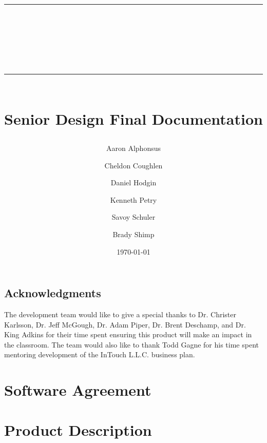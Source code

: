 \documentclass{book}
\title{{\color{SDColor3} \rule{\linewidth}{0.5mm}}\\[2mm] {\huge \bfseries \color{SDColor3} \teamName}\\[-1mm] {\color{SDColor3}\rule{\linewidth}{0.5mm}} \\  \vfill
{\LARGE \bfseries \color{SDColor4} Senior Design Final Documentation }\\  \vfill 
{\color{SDColor3} \teamName} }
\author
{
	\color{SDColor3} Aaron Alphonsus 
	\and \color{SDColor3} Cheldon Coughlen 
	\and \color{SDColor3} Daniel Hodgin 
	\and \color{SDColor3} Kenneth Petry 
	\and \color{SDColor3} Savoy Schuler
	\and \color{SDColor3} Brady Shimp
}
\date{\color{SDColor3} \today}
\begin{document}
\frontmatter

\maketitle

\vspace*{\fill}

\section*{Acknowledgments}
\label{SpecialThanks}  
The development team would like to give a special thanks to Dr. Christer Karlsson, Dr. Jeff McGough, Dr. Adam Piper, Dr. Brent Deschamp, and Dr. King Adkins for their time spent ensuring this product will make an impact in the classroom.  The team would also like to thank Todd Gagne for his time spent mentoring development of the InTouch L.L.C. business plan. 

\vspace*{\fill}

\tableofcontents
{}
\listoffigures
{}
\listoftables
{}

\mainmatter




\agreement

\chapter{Software Agreement}


\appendix

\chapter{Product Description}






\backmatter
\end{document}
